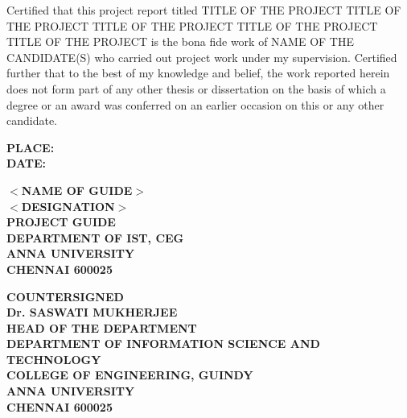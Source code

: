 \documentclass[13 pt,a4paper]{aureportm}
\begin{document}
\begin{spacing}{1.5}
  \begin{sloppypar}
  \fontsize{13}{14.5}\selectfont Certified that this project report titled TITLE OF THE PROJECT TITLE OF THE PROJECT TITLE OF THE PROJECT TITLE OF THE PROJECT TITLE OF THE PROJECT is the bona fide work of NAME OF THE CANDIDATE(S) who carried out project work under my supervision. Certified further that to the best of my knowledge and belief, the work reported herein does not form part of any other thesis or dissertation on the basis of which a degree or an award was conferred on an earlier occasion on this or any other candidate.
  \end{sloppypar}
\end{spacing}
\vspace{-0.3 cm}
\begin{flushleft}
 \parbox[t]{\datewidth}{\small{\textbf{PLACE: }}\\
 \small{\textbf{DATE: }}}
 \hfill
 \parbox[t]{6 cm}{\small{\textbf{$<$NAME OF GUIDE$>$}} \\
 \small{\textbf{$<$DESIGNATION$>$}}\\
 \small{\textbf{PROJECT GUIDE}}\\
 \small{\textbf{DEPARTMENT OF IST, CEG}}\\
 \small{\textbf{ANNA UNIVERSITY}}   \\
 \small{\textbf{CHENNAI  600025}}
 }
\end{flushleft}
\begin{center}
 \small{\textbf{COUNTERSIGNED}}\\ 
  \vspace{1.5 cm}
  \textbf{\small{Dr. SASWATI MUKHERJEE}}\\ 
  \small{\textbf{HEAD OF THE DEPARTMENT}}\\
 \small{\textbf{DEPARTMENT OF INFORMATION SCIENCE AND TECHNOLOGY}}\\
 \small{\textbf{COLLEGE OF ENGINEERING, GUINDY}}\\
 \small{\textbf{ANNA UNIVERSITY}}   \\
 \small{\textbf{CHENNAI  600025}}
 
\end{center}




\end{document}
